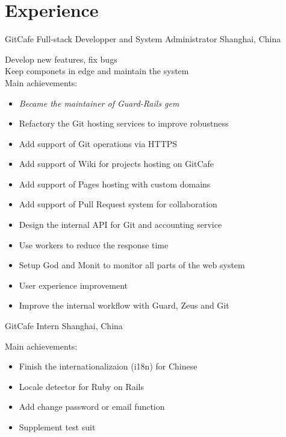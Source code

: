 \documentclass[]{friggeri-cv} %
\begin{document}

\section{Experience}

\begin{entrylist}
  {GitCafe \textnormal{Full-stack Developper and System Administrator}}
  {Shanghai, China}
  {
    Develop new features, fix bugs\\
    Keep componets in edge and maintain the system\\
    Main achievements:
    \begin{itemize}
    \item \emph{Became the maintainer of Guard-Rails gem}
    \item Refactory the Git hosting services to improve robustness
    \item Add support of Git operations via HTTPS
    \item Add support of Wiki for projects hosting on GitCafe
    \item Add support of Pages hosting with custom domains
    \item Add support of Pull Request system for collaboration
    \item Design the internal API for Git and accounting service
    \item Use workers to reduce the response time
    \item Setup God and Monit to monitor all parts of the web system
    \item User experience improvement
    \item Improve the internal workflow with Guard, Zeus and Git
    \end{itemize}
  }
  {GitCafe \textnormal{Intern}}
  {Shanghai, China}
  {
    Main achievements:
    \begin{itemize}
    \item Finish the internationalizaion (i18n) for Chinese
    \item Locale detector for Ruby on Rails
    \item Add change password or email function
    \item Supplement test suit
    \end{itemize}
  }
\end{entrylist}
\end{document}
